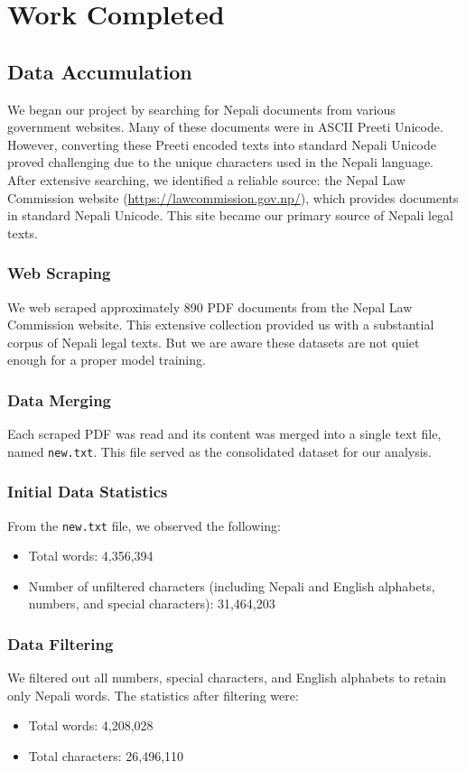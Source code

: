 \chapter{Work Completed}
\section{Data Accumulation}
We began our project by searching for Nepali documents from various government websites. Many of these documents were in ASCII Preeti Unicode. However, converting these Preeti encoded texts into standard Nepali Unicode proved challenging due to the unique characters used in the Nepali language. After extensive searching, we identified a reliable source: the Nepal Law Commission website (\url{https://lawcommission.gov.np/}), which provides documents in standard Nepali Unicode. This site became our primary source of Nepali legal texts.

\subsection{Web Scraping}
We web scraped approximately 890 PDF documents from the Nepal Law Commission website. This extensive collection provided us with a substantial corpus of Nepali legal texts. But we are aware these datasets are not quiet enough for a proper model training.

\subsection{Data Merging}
Each scraped PDF was read and its content was merged into a single text file, named \texttt{new.txt}. This file served as the consolidated dataset for our analysis.

\subsection{Initial Data Statistics}
From the \texttt{new.txt} file, we observed the following:
\begin{itemize}
    \item Total words: 4,356,394
    \item Number of unfiltered characters (including Nepali and English alphabets, numbers, and special characters): 31,464,203
\end{itemize}

\subsection{Data Filtering}
We filtered out all numbers, special characters, and English alphabets to retain only Nepali words. The statistics after filtering were:
\begin{itemize}
    \item Total words: 4,208,028
    \item Total characters: 26,496,110
\end{itemize}

